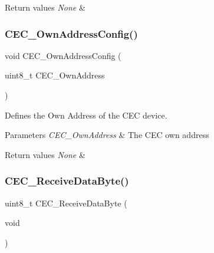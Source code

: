 \begin{DoxyRetVals}{Return values}
{\em None} & \\
\hline
\end{DoxyRetVals}
\mbox{\label{group___c_e_c___exported___functions_gacad422ef1f50246b2021b41835b8a95c}} 
\subsubsection{\texorpdfstring{CEC\_OwnAddressConfig()}{CEC\_OwnAddressConfig()}}
{\footnotesize\ttfamily void C\+E\+C\+\_\+\+Own\+Address\+Config (\begin{DoxyParamCaption}\item[{uint8\+\_\+t}]{C\+E\+C\+\_\+\+Own\+Address }\end{DoxyParamCaption})}



Defines the Own Address of the C\+EC device. 


\begin{DoxyParams}{Parameters}
{\em C\+E\+C\+\_\+\+Own\+Address} & The C\+EC own address \\
\hline
\end{DoxyParams}

\begin{DoxyRetVals}{Return values}
{\em None} & \\
\hline
\end{DoxyRetVals}
\mbox{\label{group___c_e_c___exported___functions_ga165837bff6292e7674eff6f8b230da97}} 
\subsubsection{\texorpdfstring{CEC\_ReceiveDataByte()}{CEC\_ReceiveDataByte()}}
{\footnotesize\ttfamily uint8\+\_\+t C\+E\+C\+\_\+\+Receive\+Data\+Byte (\begin{DoxyParamCaption}\item[{void}]{ }\end{DoxyParamCaption})}



